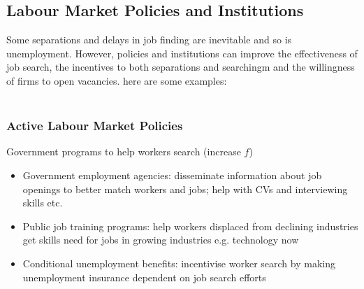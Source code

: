 \documentclass[12pt, letterpaper]{article}
\begin{document}
\subsection{Labour Market Policies and Institutions}
Some separations and delays in job finding are inevitable and so is unemployment. However, policies and institutions can improve the effectiveness of job search, the incentives to both separations and searchingm and the willingness of firms to open vacancies. here are some examples:\\\\
\subsubsection{Active Labour Market Policies}
Government programs to help workers search (increase $f$)
\begin{itemize}
	\item Government employment agencies: disseminate information about job openings to better match workers and jobs; help with CVs and interviewing skills etc.
	\item Public job training programs: help workers displaced from declining industries get skills need for jobs in growing industries e.g. technology now
	\item Conditional unemployment benefits: incentivise worker search by making unemployment insurance dependent on job search efforts \\
\end{itemize}
\end{document}
